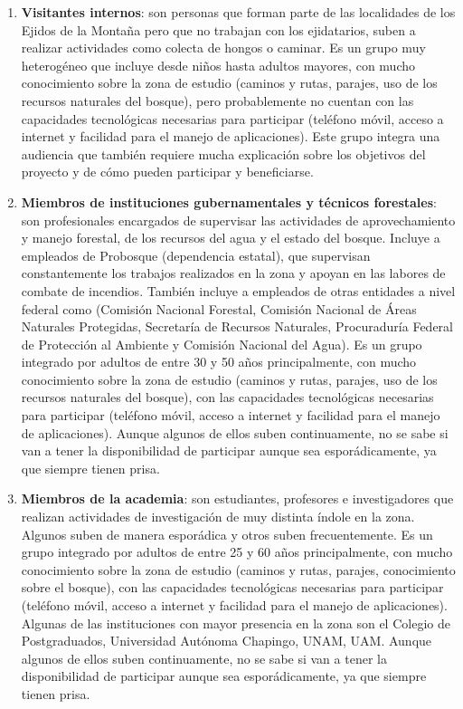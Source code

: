 \begin{enumerate}
    \item \textbf{Visitantes internos}: son personas que forman parte de las localidades de los Ejidos de la Montaña pero que no trabajan con los ejidatarios, suben a realizar actividades como colecta de hongos o caminar. Es un grupo muy heterogéneo que incluye desde niños hasta adultos mayores, con mucho conocimiento sobre la zona de estudio (caminos y rutas, parajes, uso de los recursos naturales del bosque), pero probablemente no cuentan con las capacidades tecnológicas necesarias para participar (teléfono móvil, acceso a internet y facilidad para el manejo de aplicaciones).  Este grupo integra una audiencia que también requiere mucha explicación sobre los objetivos del proyecto y de cómo pueden participar y beneficiarse.
    \item \textbf{Miembros de instituciones gubernamentales y técnicos forestales}: son profesionales encargados de supervisar las actividades de aprovechamiento y manejo forestal, de los recursos del agua y el estado del bosque. Incluye a empleados de Probosque (dependencia estatal), que supervisan constantemente los trabajos realizados en la zona y apoyan en las labores de combate de incendios. También incluye a empleados de otras entidades a nivel federal como (Comisión Nacional Forestal, Comisión Nacional de Áreas Naturales Protegidas, Secretaría de Recursos Naturales, Procuraduría Federal de Protección al Ambiente y Comisión Nacional del Agua). Es un grupo integrado por adultos de entre 30 y 50 años principalmente, con mucho conocimiento sobre la zona de estudio (caminos y rutas, parajes, uso de los recursos naturales del bosque), con las capacidades tecnológicas necesarias para participar (teléfono móvil, acceso a internet y facilidad para el manejo de aplicaciones).  Aunque algunos de ellos suben continuamente, no se sabe si van a tener la disponibilidad de participar aunque sea esporádicamente, ya que siempre tienen prisa.
    \item \textbf{Miembros de la academia}: son estudiantes, profesores e investigadores que realizan actividades de investigación de muy distinta índole en la zona. Algunos suben de manera esporádica y otros suben frecuentemente. Es un grupo integrado por adultos de entre 25 y 60 años principalmente, con mucho conocimiento sobre la zona de estudio (caminos y rutas, parajes, conocimiento sobre el bosque), con las capacidades tecnológicas necesarias para participar (teléfono móvil, acceso a internet y facilidad para el manejo de aplicaciones). Algunas de las instituciones con mayor presencia en la zona son el Colegio de Postgraduados, Universidad Autónoma Chapingo, UNAM, UAM. Aunque algunos de ellos suben continuamente, no se sabe si van a tener la disponibilidad de participar aunque sea esporádicamente, ya que siempre tienen prisa.
\end{enumerate}

